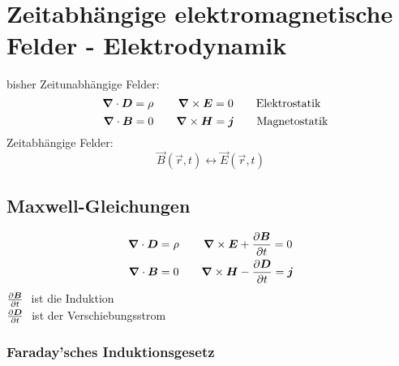 


\chapter{Zeitabhängige elektromagnetische Felder - Elektrodynamik}

bisher Zeitunabhängige Felder:
\begin{equation*}
\, \bm{\nabla} \cdot \bm{D} = \rho \qquad \, \bm{\nabla} \times \bm{E} = 0 \qquad \textrm{Elektrostatik}
\end{equation*}
\begin{equation*}
\ \ \: \bm{\nabla} \cdot \bm{B} = 0 \qquad \bm{\nabla} \times \bm{H} = \bm{j} \qquad \textrm{Magnetostatik}
\end{equation*}
Zeitabhängige Felder:
\begin{equation*}
\vec{B}(\vec{r}, t) \leftrightarrow \vec{E}(\vec{r}, t)
\end{equation*}

\section{Maxwell-Gleichungen}

\begin{align*}
\bm{\nabla} \cdot \bm{D} &= \rho \qquad \, \bm{\nabla} \times \bm{E} + \frac{\partial \bm{B}}{\partial t} = 0 \\
\bm{\nabla} \cdot \bm{B} &= 0 \qquad \bm{\nabla} \times \bm{H} - \frac{\partial \bm{D}}{\partial t} = \bm{j}
\end{align*}
$ \prt{\vec{B}}{t} \ $ ist die Induktion\\[3pt]
$ \frac{\partial \bm{D}}{\partial t} \ $ ist der Verschiebungsstrom\\

\subsection{Faraday'sches Induktionsgesetz}

